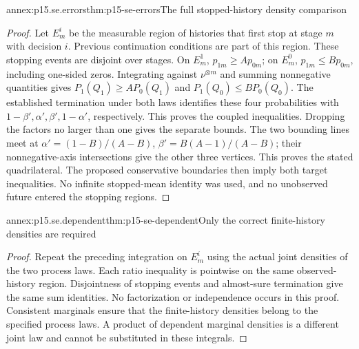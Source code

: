 \begin{annexitem}{annex:p15.se.errors}{thm:p15-se-errors}{The full stopped-history density comparison}
\begin{proof}
Let \(E_m^i\) be the measurable region of histories that first stop
at stage \(m\) with decision \(i\). Previous continuation conditions
are part of this region. These stopping events are disjoint over
stages. On \(E_m^1\), \(p_{1m}\geq Ap_{0m}\); on
\(E_m^0\), \(p_{1m}\leq Bp_{0m}\), including one-sided zeros.
Integrating against \(\nu^{\otimes m}\) and summing nonnegative
quantities gives
\(P_1(Q_1)\geq AP_0(Q_1)\) and
\(P_1(Q_0)\leq BP_0(Q_0)\). The established termination under both
laws identifies these four probabilities with
\(1-\beta',\alpha',\beta',1-\alpha'\), respectively.
This proves the coupled inequalities. Dropping the factors no larger
than one gives the separate bounds. The two bounding lines meet at
\(\alpha'=(1-B)/(A-B)\),
\(\beta'=B(A-1)/(A-B)\); their nonnegative-axis intersections give
the other three vertices. This proves the stated quadrilateral.
The proposed conservative boundaries
then imply both target inequalities. No infinite stopped-mean identity
was used, and no unobserved future entered the stopping regions.
\end{proof}
\end{annexitem}

\begin{annexitem}{annex:p15.se.dependent}{thm:p15-se-dependent}{Only the correct finite-history densities are required}
\begin{proof}
Repeat the preceding integration on \(E_m^i\) using the actual
joint densities of the two process laws. Each ratio inequality is
pointwise on the same observed-history region. Disjointness of stopping
events and almost-sure termination give the same sum identities.
No factorization or independence occurs in this proof. Consistent
marginals ensure that the finite-history densities belong to the
specified process laws. A product of dependent marginal densities is
a different joint law and cannot be substituted in these integrals.
\end{proof}
\end{annexitem}

